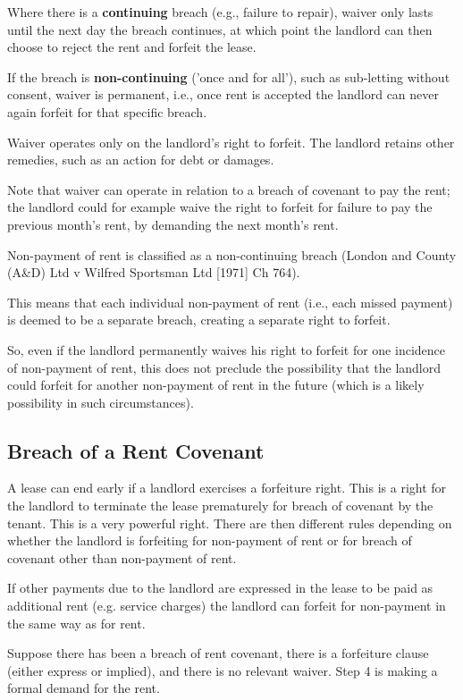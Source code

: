 \documentclass[
]{article}
\begin{document}
Where there is a \textbf{continuing} breach (e.g., failure to repair),
waiver only lasts until the next day the breach continues, at which
point the landlord can then choose to reject the rent and forfeit the
lease.

If the breach is \textbf{non-continuing} ('once and for all'), such as
sub-letting without consent, waiver is permanent, i.e., once rent is
accepted the landlord can never again forfeit for that specific breach.

Waiver operates only on the landlord's right to forfeit. The landlord
retains other remedies, such as an action for debt or damages.

Note that waiver can operate in relation to a breach of covenant to pay
the rent; the landlord could for example waive the right to forfeit for
failure to pay the previous month's rent, by demanding the next month's
rent.

Non-payment of rent is classified as a non-continuing breach (London and
County (A\&D) Ltd v Wilfred Sportsman Ltd {[}1971{]} Ch 764).

This means that each individual non-payment of rent (i.e., each missed
payment) is deemed to be a separate breach, creating a separate right to
forfeit.

So, even if the landlord permanently waives his right to forfeit for one
incidence of non-payment of rent, this does not preclude the possibility
that the landlord could forfeit for another non-payment of rent in the
future (which is a likely possibility in such circumstances).

\hypertarget{breach-of-a-rent-covenant}{%
\subsection{Breach of a Rent Covenant}\label{breach-of-a-rent-covenant}}

A lease can end early if a landlord exercises a forfeiture right. This
is a right for the landlord to terminate the lease prematurely for
breach of covenant by the tenant. This is a very powerful right. There
are then different rules depending on whether the landlord is forfeiting
for non-payment of rent or for breach of covenant other than non-payment
of rent.

If other payments due to the landlord are expressed in the lease to be
paid as additional rent (e.g. service charges) the landlord can forfeit
for non-payment in the same way as for rent.

Suppose there has been a breach of rent covenant, there is a forfeiture
clause (either express or implied), and there is no relevant waiver.
Step 4 is making a formal demand for the rent.
\end{document}
